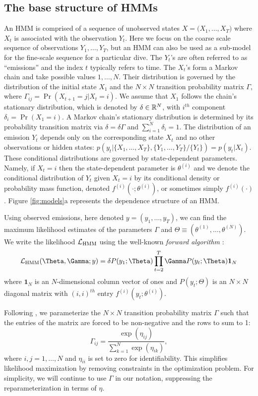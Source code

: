 \subsection{The base structure of HMMs}

An HMM is comprised of a sequence of unobserved states $X = \big(X_1, \ldots, X_T\big)$ where $X_t$ is associated with the observation $Y_t$. Here we focus on the coarse scale sequence of observations $Y_1,\ldots, Y_T$, but an HMM can also be used as a sub-model for the fine-scale sequence for a particular dive. The $Y_t$'s are often referred to as ``emissions'' and the index $t$ typically refers to time. 
The $X_t$'s form a Markov chain and take possible values $1, \ldots, N$. Their distribution is governed by the distribution of the initial state $X_1$ and the $N \times N$ transition probability matrix $\Gamma$, where $\Gamma_{ij} = \Pr(X_{t+1} = j | X_t = i)$. 
%
We assume that $X_1$ follows the chain's stationary distribution, which is denoted by $\delta \in \mathbb{R}^N$, with $i^{th}$ component
$\delta_i = \Pr(X_1 = i).$
A Markov chain's stationary distribution is determined by its probability transition matrix via $\delta = \delta \Gamma$ and $\sum_{i=1}^N \delta_i = 1$.
%
The distribution of an emission $Y_t$ depends only on the corresponding state $X_t$ and no other observations or hidden states: $p\left(y_t|\{X_1,\ldots, X_T\},\{Y_1,\ldots, Y_T\}/ \{Y_t\}\right) = p(y_t|X_t)$.
%
These conditional distributions are governed by state-dependent parameters. Namely, if $X_t = i$ then the state-dependent parameter is $\theta^{(i)}$ and we denote the conditional distribution of $Y_t$ given $X_t=i$ by its conditional density or probability mass function, denoted $f^{(i)}(\cdot ; \theta^{(i)})$, or sometimes simply $f^{(i)}(\cdot)$.
%
Figure \ref{fig:models}a represents the dependence structure of an HMM.

Using observed emissions, here denoted $y = (y_1,\ldots,y_T)$, we can find the maximum likelihood estimates of the parameters $\Gamma$ and $\Theta \equiv (\theta^{(1)},\ldots,\theta^{(N)})$. We write the likelihood $\mathcal{L}_{\text{HMM}}$ using the  well-known \textit{forward algorithm} \citep{Zucchini:2016}:
%
$$\calL_{\text{HMM}}(\Theta,\Gamma;y) = \delta P(y_1;\Theta) \prod_{t=2}^T \Gamma P(y_t;\Theta) \mathbf{1}_N$$
%
where $\mathbf{1}_N$ is an $N$-dimensional column vector of ones and
%
$P(y_t;\Theta)$ is an $N \times N$ diagonal matrix with $(i,i)^{th}$ entry  $f^{(i)}(y_t; \theta^{(i)})$.
%

Following \citet{Barajas:2017}, we parameterize the $N \times N$ transition probability matrix $\Gamma$ such that the entries of the matrix are forced to be non-negative and the rows to sum to 1:
%
\[
\Gamma_{ij} = \frac{\exp(\eta_{ij})}{\sum_{k=1}^N \exp(\eta_{ik})}, 
\]
%
where $i,j = 1,\ldots,N$ and $\eta_{ii}$ is set to zero for identifiability. This simplifies likelihood maximization by removing constraints in the optimization problem. For simplicity, we will continue to use $\Gamma$ in our notation, suppressing the reparameterization in terms of $\eta$.


